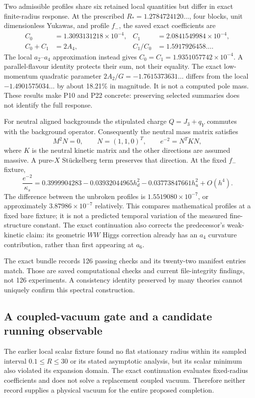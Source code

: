 Two admissible profiles share six retained local quantities but differ in exact finite-radius response. At the prescribed $R_*=1.2784724120\ldots$, four blocks, unit dimensionless Yukawas, and profile $f_-$, the saved exact coefficients are
\begin{align}
 C_0&=1.3093131218\times10^{-4},&
 C_1&=2.0841549984\times10^{-4},\\
 C_0+C_1&=2A_4,& C_1/C_0&=1.5917926458\ldots .
\end{align}
The local $a_2$--$a_4$ approximation instead gives $C_0=C_1=1.9351057742\times10^{-4}$. A parallel-flavour identity protects their sum, not their equality. The exact low-momentum quadratic parameter $2A_2/G=-1.7615373631\ldots$ differs from the local $-1.4901575034\ldots$ by about 18.21\% in magnitude. It is not a computed pole mass. These results make P10 and P22 concrete: preserving selected summaries does not identify the full response.

For neutral aligned backgrounds the stipulated charge $Q=J_3+q_Y$ commutes with the background operator. Consequently the neutral mass matrix satisfies
\begin{equation}
 M^2N=0,\qquad N=(1,1,0)^T,\qquad e^{-2}=N^TKN,
\end{equation}
where $K$ is the neutral kinetic matrix and the other directions are assumed massive. A pure-$X$ St\"uckelberg term preserves that direction. At the fixed $f_-$ fixture,
\begin{equation}
 \frac{e^{-2}}{\kappa_s}=0.3999904283
 -0.03932044965h_d^2-0.03773847661h_u^2+O(h^4).
\end{equation}
The difference between the unbroken profiles is $1.5519080\times10^{-7}$, or approximately $3.87986\times10^{-7}$ relatively. This compares mathematical profiles at a fixed bare fixture; it is not a predicted temporal variation of the measured fine-structure constant. The exact continuation also corrects the predecessor's weak-kinetic claim: its geometric $WW$ Higgs correction already has an $a_4$ curvature contribution, rather than first appearing at $a_6$.

The exact bundle records 126 passing checks and its twenty-two manifest entries match. Those are saved computational checks and current file-integrity findings, not 126 experiments. A consistency identity preserved by many theories cannot uniquely confirm this spectral construction.

\subsection{A coupled-vacuum gate and a candidate running observable}
The earlier local scalar fixture found no flat stationary radius within its sampled interval $0.1\le R\le30$ or its stated asymptotic analysis, but its scalar minimum also violated its expansion domain. The exact continuation evaluates fixed-radius coefficients and does not solve a replacement coupled vacuum. Therefore neither record supplies a physical vacuum for the entire proposed completion.

